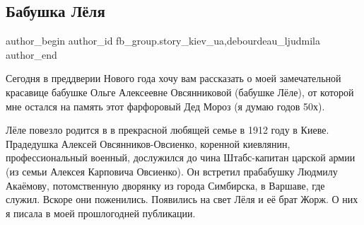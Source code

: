  
 
 
 
 
 
\subsection{Бабушка Лёля}
\label{sec:28_12_2021.fb.fb_group.story_kiev_ua.1.babushka_lelja}
 
\ifcmt
 author_begin
   author_id fb_group.story_kiev_ua,debourdeau_ljudmila
 author_end
\fi

Сегодня в преддверии Нового года хочу вам рассказать о моей замечательной
красавице бабушке Ольге Алексеевне Овсянниковой (бабушке Лёле), от которой мне
остался на память этот фарфоровый Дед Мороз (я думаю годов 50х). 

Лёле повезло родится в в прекрасной любящей семье в 1912 году в Киеве.
Прадедушка Алексей Овсянников-Овсиенко, коренной киевлянин, профессиональный
военный, дослужился до чина Штабс-капитан царской армии (из семьи Алексея
Карповича Овсиенко). Он встретил прабабушку Людмилу Акаёмову, потомственную
дворянку из города Симбирска, в Варшаве, где служил. Вскоре они поженились.
Появились на свет Лёля и её брат Жорж. О них я писала в моей прошлогодней
публикации. 

\raggedcolumns
\begin{multicols}{3} %
\setlength{\parindent}{0pt}




\end{multicols} %


